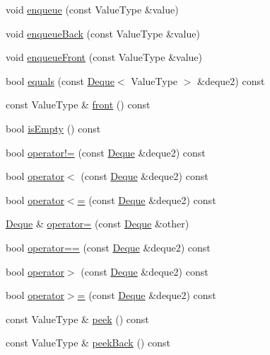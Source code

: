 \begin{DoxyCompactItemize}
\item 
void \mbox{\hyperlink{classDeque_a663f69ed5d98f3f167202e9b2d7e7a9a}{enqueue}} (const Value\+Type \&value)
\item 
void \mbox{\hyperlink{classDeque_a2fdd7308cc72a3bd03dd6345ef778a65}{enqueue\+Back}} (const Value\+Type \&value)
\item 
void \mbox{\hyperlink{classDeque_a12586c9fec2e0dd724cf6ccb4d52c6e8}{enqueue\+Front}} (const Value\+Type \&value)
\item 
bool \mbox{\hyperlink{classDeque_a2468abeaef57d95b43a90b7462ff88ab}{equals}} (const \mbox{\hyperlink{classDeque}{Deque}}$<$ Value\+Type $>$ \&deque2) const
\item 
const Value\+Type \& \mbox{\hyperlink{classDeque_a02aaa52ad7a120201f6dd3e90eff737f}{front}} () const
\item 
bool \mbox{\hyperlink{classDeque_acf82f9b2937375c7b1cf3dccb3df3312}{is\+Empty}} () const
\item 
bool \mbox{\hyperlink{classDeque_a512bc8214fed49868d85acd8f1e351d3}{operator!=}} (const \mbox{\hyperlink{classDeque}{Deque}} \&deque2) const
\item 
bool \mbox{\hyperlink{classDeque_afdfe6d4b99c8d185f9f8c6d48fc19c88}{operator$<$}} (const \mbox{\hyperlink{classDeque}{Deque}} \&deque2) const
\item 
bool \mbox{\hyperlink{classDeque_a08a801e1cca1a84e7fae799f5c12696e}{operator$<$=}} (const \mbox{\hyperlink{classDeque}{Deque}} \&deque2) const
\item 
\mbox{\hyperlink{classDeque}{Deque}} \& \mbox{\hyperlink{classDeque_a1fedefadfc83c266110c8f6b135c1106}{operator=}} (const \mbox{\hyperlink{classDeque}{Deque}} \&other)
\item 
bool \mbox{\hyperlink{classDeque_a7c3d72e4bc4a27ebfd08adbcddbb80f8}{operator==}} (const \mbox{\hyperlink{classDeque}{Deque}} \&deque2) const
\item 
bool \mbox{\hyperlink{classDeque_ad16a7887ef76856de7f882fb53cc8992}{operator$>$}} (const \mbox{\hyperlink{classDeque}{Deque}} \&deque2) const
\item 
bool \mbox{\hyperlink{classDeque_a033d291120793fffa944ffcc72cc947a}{operator$>$=}} (const \mbox{\hyperlink{classDeque}{Deque}} \&deque2) const
\item 
const Value\+Type \& \mbox{\hyperlink{classDeque_a74501ededf728c31068dd28a70a8a1f2}{peek}} () const
\item 
const Value\+Type \& \mbox{\hyperlink{classDeque_a617bbcedcfbc36e19f4aa806074da07e}{peek\+Back}} () const

\end{DoxyCompactItemize}
